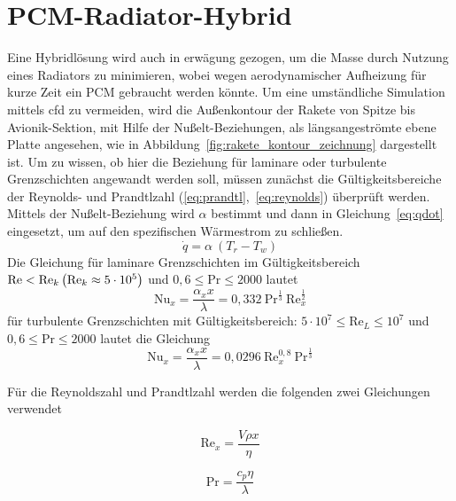 \section{PCM-Radiator-Hybrid}\label{sec:pcmRadiatorHybrid}
Eine Hybridlösung wird auch in erwägung gezogen, um die Masse durch Nutzung eines Radiators zu minimieren, wobei wegen aerodynamischer Aufheizung für kurze Zeit ein PCM gebraucht werden könnte.
Um eine umständliche Simulation mittels \ac{cfd} zu vermeiden, wird die Außenkontour der Rakete von Spitze bis Avionik-Sektion, mit Hilfe der Nußelt-Beziehungen, als längsangeströmte ebene Platte angesehen,
wie in Abbildung~\ref{fig:rakete_kontour_zeichnung} dargestellt ist.
Um zu wissen, ob hier die Beziehung für laminare oder turbulente Grenzschichten angewandt werden soll, müssen zunächst die Gültigkeitsbereiche der Reynolds- und Prandtlzahl (\ref{eq:prandtl},~\ref{eq:reynolds}) überprüft werden.
Mittels der Nußelt-Beziehung wird $\alpha$ bestimmt und dann in Gleichung~\ref{eq:qdot} eingesetzt, um auf den spezifischen Wärmestrom zu schließen.
\begin{equation}
  \label{eq:qdot}
  \dot{q} = \alpha \ (T_r - T_w)
\end{equation}
Die Gleichung für laminare Grenzschichten im Gültigkeitsbereich $\text{Re} < \text{Re}_k\\\left(\text{Re}_k \approx 5 \cdot 10^5\right)$ und $0,6 \leq \text{Pr} \leq 2000$ lautet
\begin{equation}
  \label{eq:nusselt_laminar}
  \text{Nu}_x = \frac{\alpha_x x}{\lambda} = 0,332 \ \text{Pr}^{\frac{1}{3}} \ \text{Re}_x^{\frac{1}{2}}
\end{equation}
für turbulente Grenzschichten mit Gültigkeitsbereich: $5 \cdot 10^7 \leq \text{Re}_L \leq 10^7$ und $ 0,6 \leq \text{Pr} \leq 2000$ lautet die Gleichung
\begin{equation}
  \label{eq:nusselt_turbulent}
  \text{Nu}_x = \frac{\alpha_x x}{\lambda} = 0,0296 \ \text{Re}_x^{0,8} \ \text{Pr}^{\frac{1}{3}}
\end{equation}

Für die Reynoldszahl und Prandtlzahl werden die folgenden zwei Gleichungen verwendet
\newline
\noindent\begin{minipage}{.5\linewidth}
\begin{equation}
  \label{eq:reynolds}
  \text{Re}_x = \frac{V \rho x}{\eta}
\end{equation}
\end{minipage}%
\begin{minipage}{.5\linewidth}
\begin{equation}
  \label{eq:prandtl}
  \text{Pr} = \frac{c_p \eta}{\lambda}
\end{equation}
\end{minipage}

